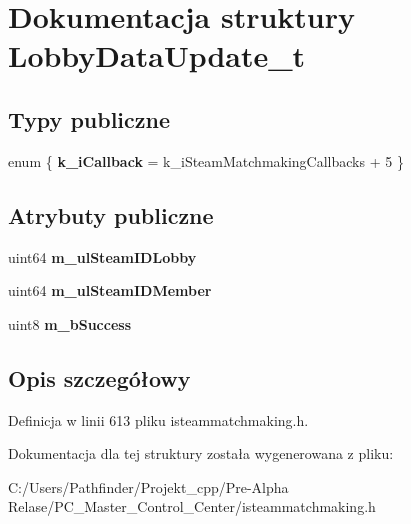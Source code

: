 \hypertarget{struct_lobby_data_update__t}{}\section{Dokumentacja struktury Lobby\+Data\+Update\+\_\+t}
\label{struct_lobby_data_update__t}
\subsection*{Typy publiczne}
\begin{DoxyCompactItemize}
\item 
\mbox{\label{struct_lobby_data_update__t_a75f28b4da20a426dab7f75748fce00c0}} 
enum \{ {\bfseries k\+\_\+i\+Callback} = k\+\_\+i\+Steam\+Matchmaking\+Callbacks + 5
 \}
\end{DoxyCompactItemize}
\subsection*{Atrybuty publiczne}
\begin{DoxyCompactItemize}
\item 
\mbox{\label{struct_lobby_data_update__t_a2764fd8048ccdb64e5cd796da0a45292}} 
uint64 {\bfseries m\+\_\+ul\+Steam\+I\+D\+Lobby}
\item 
\mbox{\label{struct_lobby_data_update__t_aca7589b9afc73335dc35988e26cf0aa8}} 
uint64 {\bfseries m\+\_\+ul\+Steam\+I\+D\+Member}
\item 
\mbox{\label{struct_lobby_data_update__t_ad06bc75f22a6067b7a4c2c0140e9df93}} 
uint8 {\bfseries m\+\_\+b\+Success}
\end{DoxyCompactItemize}


\subsection{Opis szczegółowy}


Definicja w linii 613 pliku isteammatchmaking.\+h.



Dokumentacja dla tej struktury została wygenerowana z pliku\+:\begin{DoxyCompactItemize}
\item 
C\+:/\+Users/\+Pathfinder/\+Projekt\+\_\+cpp/\+Pre-\/\+Alpha Relase/\+P\+C\+\_\+\+Master\+\_\+\+Control\+\_\+\+Center/isteammatchmaking.\+h\end{DoxyCompactItemize}

